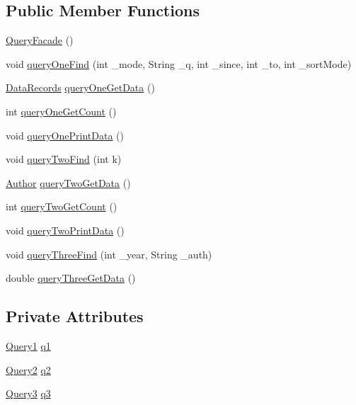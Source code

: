 \subsection*{Public Member Functions}
\begin{DoxyCompactItemize}
\item 
\hyperlink{classQueryFacade_a8dcf16994023ad1ca01e81a6183fcf83}{Query\+Facade} ()
\item 
void \hyperlink{classQueryFacade_ac92989cd2e594e7c33191b16d7aced66}{query\+One\+Find} (int \+\_\+mode, String \+\_\+q, int \+\_\+since, int \+\_\+to, int \+\_\+sort\+Mode)
\item 
\hyperlink{classDataRecords}{Data\+Records} \hyperlink{classQueryFacade_adf9324b3f38765b2b6c1b4a64b301a11}{query\+One\+Get\+Data} ()
\item 
int \hyperlink{classQueryFacade_a9c560f383a78c0757847bf898b647dfa}{query\+One\+Get\+Count} ()
\item 
void \hyperlink{classQueryFacade_a57707fb4c9fc7cb9b57003e0ea36dc20}{query\+One\+Print\+Data} ()
\item 
void \hyperlink{classQueryFacade_ae9371edaf51074aa8ad0c108e492755f}{query\+Two\+Find} (int k)
\item 
\hyperlink{classAuthor}{Author} \hyperlink{classQueryFacade_a01ab933fe12fac06556af3e2948dbe58}{query\+Two\+Get\+Data} ()
\item 
int \hyperlink{classQueryFacade_a31b305c90f782be21b5c51692bc0d896}{query\+Two\+Get\+Count} ()
\item 
void \hyperlink{classQueryFacade_ae13645f131baebb112c3af3c8fc1401e}{query\+Two\+Print\+Data} ()
\item 
void \hyperlink{classQueryFacade_afa8c14d931ca1708a09ae94bd435504a}{query\+Three\+Find} (int \+\_\+year, String \+\_\+auth)
\item 
double \hyperlink{classQueryFacade_a394c9283bc3bdfc0060a5eabece24782}{query\+Three\+Get\+Data} ()
\end{DoxyCompactItemize}
\subsection*{Private Attributes}
\begin{DoxyCompactItemize}
\item 
\hyperlink{classQuery1}{Query1} \hyperlink{classQueryFacade_ac16b7d9bc39fc5e88232a7a271c0ea9c}{q1}
\item 
\hyperlink{classQuery2}{Query2} \hyperlink{classQueryFacade_a4ee742366b301a5101dc0093bab15c4f}{q2}
\item 
\hyperlink{classQuery3}{Query3} \hyperlink{classQueryFacade_ac287507d9f5380c11f9cc26856e6a6b3}{q3}
\end{DoxyCompactItemize}


